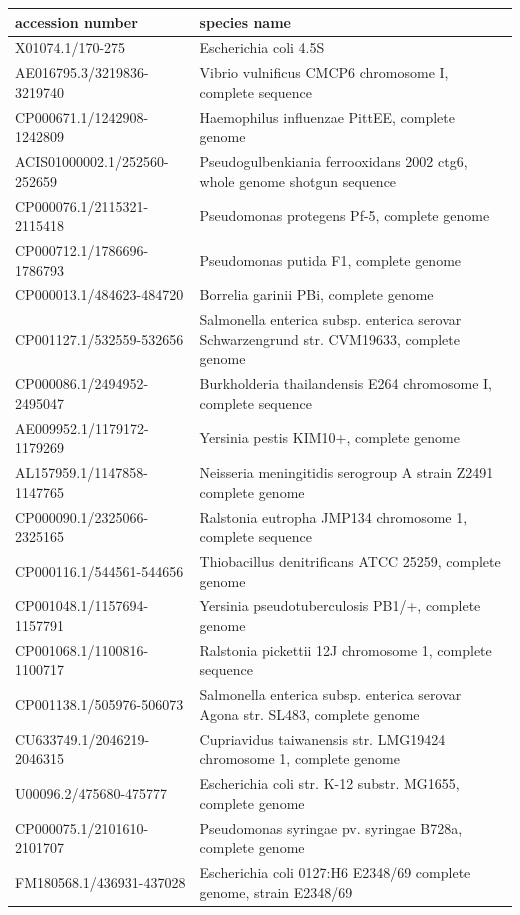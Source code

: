 \documentclass[ twoside,openright,titlepage,numbers=noenddot,headinclude,%
                footinclude=false, cleardoublepage=empty,abstractoff, %
                BCOR=5mm,paper=a4,fontsize=11pt,%
                ngerman,american,%
                ]{scrreprt}
\begin{document}
\begin{table}
\tiny
\begin{tabular}{l|l}
accession number &	species name \\
\hline
X01074.1/170-275		&Escherichia coli 4.5S\\
AE016795.3/3219836-3219740& 	Vibrio vulnificus CMCP6 chromosome I, complete sequence\\
CP000671.1/1242908-1242809 &	Haemophilus influenzae PittEE, complete genome\\
ACIS01000002.1/252560-252659& 	Pseudogulbenkiania ferrooxidans 2002 ctg6, whole genome shotgun sequence\\
CP000076.1/2115321-2115418 	&Pseudomonas protegens Pf-5, complete genome\\
CP000712.1/1786696-1786793 	&Pseudomonas putida F1, complete genome\\
CP000013.1/484623-484720 	&Borrelia garinii PBi, complete genome\\
CP001127.1/532559-532656 	&Salmonella enterica subsp. enterica serovar Schwarzengrund str. CVM19633, complete genome\\
CP000086.1/2494952-2495047 	&Burkholderia thailandensis E264 chromosome I, complete sequence\\
AE009952.1/1179172-1179269 	&Yersinia pestis KIM10+, complete genome\\
AL157959.1/1147858-1147765 	&Neisseria meningitidis serogroup A strain Z2491 complete genome\\
CP000090.1/2325066-2325165 	&Ralstonia eutropha JMP134 chromosome 1, complete sequence\\
CP000116.1/544561-544656 	&Thiobacillus denitrificans ATCC 25259, complete genome\\
CP001048.1/1157694-1157791 	&Yersinia pseudotuberculosis PB1/+, complete genome\\
CP001068.1/1100816-1100717 	&Ralstonia pickettii 12J chromosome 1, complete sequence\\
CP001138.1/505976-506073 	&Salmonella enterica subsp. enterica serovar Agona str. SL483, complete genome\\
CU633749.1/2046219-2046315 	&Cupriavidus taiwanensis str. LMG19424 chromosome 1, complete genome\\
U00096.2/475680-475777 		&Escherichia coli str. K-12 substr. MG1655, complete genome\\
CP000075.1/2101610-2101707 	&Pseudomonas syringae pv. syringae B728a, complete genome\\
FM180568.1/436931-437028 	&Escherichia coli 0127:H6 E2348/69 complete genome, strain E2348/69\\

\end{tabular}
\end{table}
\end{document}
